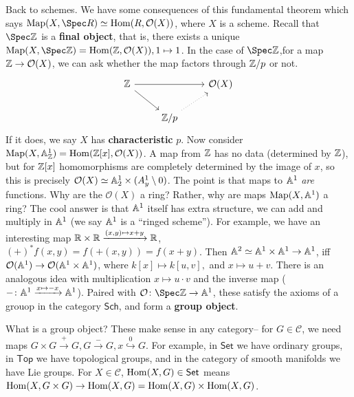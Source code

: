 Back to schemes. We have some consequences of this fundamental theorem which says $\mathrm{Map}(X,\Spec R) \simeq  \Hom (R, \mathcal{O} (X))$, where $X$ is a scheme. Recall that $\Spec \Z$ is a \textbf{final object}, that is, there exists a unique $\mathrm{Map}(X,\Spec \Z) =\Hom(\Z,\mathcal{O} (X)), 1\mapsto 1$. In the case of $\Spec \Z$,for a map $\mathbb{Z} \to  \mathcal{O} (X)$, we can ask whether the map factors through  $\mathbb{Z} /p$ or not. \[
\begin{tikzcd}
    \Z \arrow[rr]\arrow[rd] & & \mathcal{O} (X) \\
                            & \Z /p \arrow[ru, dotted] & 
\end{tikzcd}
\] If it does, we say $X$ has \textbf{characteristic} $p$. Now consider $\mathrm{Map}(X,\mathbb{A}^1 _{\mathbb{Z}}) =\operatorname{Hom} (\mathbb{Z}[x], \mathcal{O} (X))$. A map from $\mathbb{Z}$ has no data (determined by $\mathbb{Z}$), but for $\mathbb{Z}[x]$ homomorphisms are completely determined by the image of $x$, so this is precisely $\mathcal{O} (X) \simeq  \mathbb{A}_2^1 \times  (A_y^1 \setminus 0)$. The point is that maps to $\mathbb{A}^1$ \emph{are} functions. Why are the $\mathcal{O} (X)$ a ring? Rather, why are maps $\mathrm{Map}(X, \mathbb{A}^1)$ a ring? The cool answer is that $\mathbb{A}^1$ itself has extra structure, we can add and multiply in $\mathbb{A}^1$ (we say $\mathbb{A}^1$ is a ``ringed scheme''). For example, we have an interesting map $\mathbb{R} \times  \mathbb{R} \xrightarrow{(x,y) \mapsto  x+y}  \mathbb{R}$, $(+)^* f(x,y)=f(+(x,y))=f(x+y)$. Then $\mathbb{A}^2 \simeq  \mathbb{A}^1 \times \mathbb{A}^1 \to \mathbb{A}^1$, iff $\mathcal{O} (\mathbb{A}^1) \to  \mathcal{O} (\mathbb{A}^1 \times  \mathbb{A}^1)$, where $k[x] \mapsto  k[u,v],$ and $x \mapsto  u+v$. There is an analogous idea with multiplication $x \mapsto u\cdot v$ and the inverse map ($- \colon \mathbb{A}^1 \xrightarrow{x \mapsto -x} \mathbb{A}^1 $). Paired with $\mathcal{O} \colon \Spec \Z \to \A^1$, these satisfy the axioms of a grouop in the category $\mathsf{Sch} $, and form a \textbf{group object}.

What is a group object? These make sense in any category-- for $G \in \mathcal{C} $, we need maps $G \times G \xrightarrow{+} G, G \xrightarrow{-} G, x \overset{0}{\hookrightarrow} G $. For example, in $\mathsf{Set} $ we have ordinary groups, in $\mathsf{Top} $ we have topological groups, and in the category of smooth manifolds we have Lie groups. For $X \in \mathcal{C} $, $\operatorname{Hom}(X,G) \in \mathsf{Set} $ means $\operatorname{Hom} (X, G\times G) \to \operatorname{Hom}(X,G) = \operatorname{Hom}(X,G) \times \operatorname{Hom}(X,G)$.

